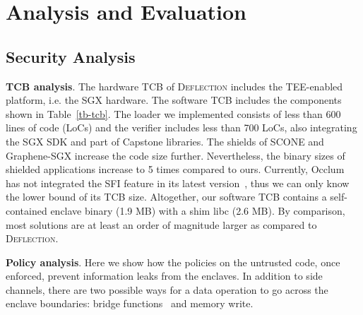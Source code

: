 \section{Analysis and Evaluation}\label{sec-evaluation}

\subsection{Security Analysis}\label{subsec-securityanalysis}

\noindent\textbf{TCB analysis}. 
The hardware TCB of \textsc{Deflection} includes the TEE-enabled platform, i.e. the SGX hardware. The software TCB includes the components shown in Table~\ref{tb-tcb}. 
The loader we implemented consists of less than 600 lines of code (LoCs) and the verifier includes less than 700 LoCs, also integrating the SGX SDK and part of Capstone libraries. 
The shields of SCONE and Graphene-SGX increase the code size further. Nevertheless, the binary sizes of shielded applications increase to 5 times compared to ours. Currently, Occlum has not integrated the SFI feature in its latest version~\cite{occlum}, thus we can only know the lower bound of its TCB size.
Altogether, our software TCB contains a self-contained enclave binary (1.9 MB) with a shim libc (2.6 MB). By comparison, most solutions are at least an order of magnitude larger as compared to \textsc{Deflection}.




\vspace{3pt}\noindent\textbf{Policy analysis}. 
Here we show how the policies on the untrusted code, once enforced, prevent information leaks from the enclaves. In addition to side channels, there are two possible ways for a data operation to go across the enclave boundaries:
bridge functions~\cite{van2019tale} and memory write.

